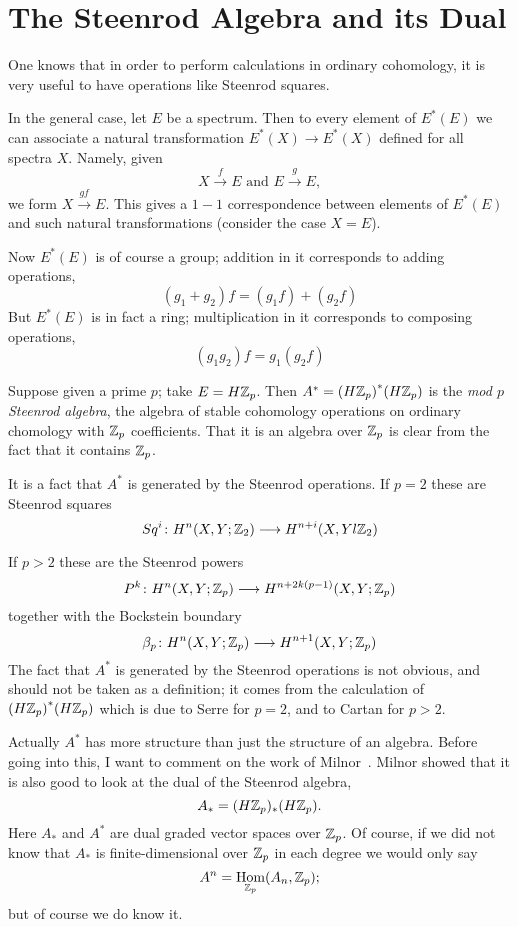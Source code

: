 \documentclass[../main]{subfiles}
\begin{document}
\chapter{The Steenrod Algebra and its Dual}
\label{sec:p3c12}
One knows that in order to perform calculations in ordinary cohomology, it is very useful to have operations like Steenrod squares.

In the general case, let $E$ be a spectrum. Then to every element of $E^\ast(E)$ we can associate a natural transformation $E^\ast(X)\longrightarrow E^\ast(X)$ defined for all spectra $X$. Namely, given
\[ X\overset f\longrightarrow E \text{ and } E\overset g\longrightarrow E, \]
we form $X\overset{gf}\longrightarrow E$. This gives a $1-1$ correspondence between elements of $E^\ast(E)$ and such natural transformations (consider the case $X=E$).

Now $E^\ast(E)$ is of course a group; addition in it corresponds to adding operations,
\[ (g_1+g_2)f = (g_1f) + (g_2f) \]
But $E^\ast(E)$ is in fact a ring; multiplication in it %
corresponds to composing operations,
\[ (g_1g_2)f = g_1(g_2f) \]

\begin{example}

Suppose given a prime $p$; take $E=H\mathbb{Z}_p$. Then $A^\ast={(H\mathbb{Z}_p)}^\ast(H\mathbb{Z}_p)$ is the \emph{mod $p$ Steenrod algebra}, the algebra of stable cohomology operations on ordinary chomology with $\mathbb{Z}_p$ coefficients. That it is an algebra over $\mathbb{Z}_p$ is clear from the fact that it contains $\mathbb{Z}_p$.

\end{example} %

It is a fact that $A^\ast$ is generated by the Steenrod operations. If $p=2$ these are Steenrod squares
\[ Sq^i\colon H^n(X, Y; \mathbb{Z}_2) \longrightarrow H^{n+i}(X, Yl \mathbb{Z}_2) \]

If $p>2$ these are the Steenrod powers
\[ P^k\colon H^n(X, Y; \mathbb{Z}_p) \longrightarrow H^{n+2k(p-1)}(X, Y;\mathbb{Z}_p) \]
together with the Bockstein boundary
\[ \beta_p\colon H^n(X,Y;\mathbb{Z}_p)\longrightarrow H^{n+1}(X,Y;\mathbb{Z}_p) \]
The fact that $A^\ast$ is generated by the Steenrod operations is not obvious, and should not be taken as a definition; it comes from the calculation of ${(H\mathbb{Z}_p)}^\ast(H\mathbb{Z}_p)$ which is due to Serre for $p=2$, and to Cartan for $p>2$.

Actually $A^\ast$ has more structure than just the structure of an algebra. Before going into this, I want to comment on the work of Milnor~\plscite{[10]}. Milnor showed that it is also good to look at the dual of the Steenrod algebra,
\[ A_\ast=(H\mathbb{Z}_p)_\ast(H\mathbb{Z}_p). \]
Here $A_\ast$ and $A^\ast$ are dual graded vector spaces over $\mathbb{Z}_p$. Of course, if we did not know that $A_\ast$ is finite-dimensional over $\mathbb{Z}_p$ in each degree we would only say
\[ A^n=\mathop{\mathrm{Hom}}_{\mathbb{Z}_p}(A_n,\mathbb{Z}_p); \]
but of course we do know it.
\end{document}
